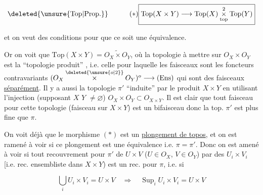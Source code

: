 \[
\deleted{\unsure{\mathrm{Top}|\mathrm{Prop.}}}\quad\tag*{\ensuremath{(*)}}\boxed{\mathrm{Top}(X\times Y)\longrightarrow\mathrm{Top}(X)\mathbin{\underset{\mathrm{top}}{\overset{2}{\times}}}\mathrm{Top}(Y)}
\]

et on veut des conditions pour que ce soit une équivalence.


Or on voit que $\mathrm{Top}(X\times Y)=\widetilde{O_X\times O_Y}$, où la topologie à mettre sur $O_X\times O_Y$ est la ``topologie produit'' \inserted{$\pi$}, i.e. celle pour laquelle les faisceaux sont les foncteurs contravariants $(O_X\mathbin{\overset{\deleted{\unsure{o|2}}}{\times}}O_Y)^o\longrightarrow(\mathrm{Ens})$ qui sont des faisceaux \uline{séparément}.  Il y a aussi la topologie $\pi'$  ``induite'' par le produit $X\times Y$ en utilisant l'injection (supposant $X$  $Y$ \deleted{\unsure{=}} $\ne\varnothing$) $O_X\times O_Y\subset O_{X\times Y}$. Il est clair que tout faisceau pour cette topologie (faisceau sur $X\times Y$) est un bifaisceau  donc la top. $\pi'$ est plus fine que $\pi$.


On voit déjà que le  morphisme $(*)$ est un \uline{plongement de topos}, et on est ramené à voir si ce plongement est une équivalence i.e. $\pi=\pi'$. Donc on est amené à voir si tout recouvrement pour $\pi'$ de $U\times V$ ($U\in O_X$, $V\in O_Y$) par des $U_i\times V_i$ [i.e. rec. ensembliste dans $X\times Y$) est un rec. pour $\pi$, i.e.  si


\[
\bigcup_i U_i\times V_i=U\times V\quad\Longrightarrow\quad\mathop{\mathrm{Sup}}_i U_i\times V_i=U\times V
\]

